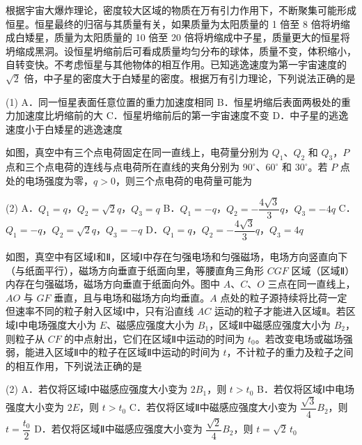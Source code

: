 \begin{question}
根据宇宙大爆炸理论，密度较大区域的物质在万有引力作用下，不断聚集可能形成恒星。恒星最终的归宿与其质量有关，如果质量为太阳质量的 1 倍至 8 倍将坍缩成白矮星，质量为太阳质量的 10 倍至 20 倍将坍缩成中子星，质量更大的恒星将坍缩成黑洞。设恒星坍缩前后可看成质量均匀分布的球体，质量不变，体积缩小，自转变快。不考虑恒星与其他物体的相互作用。已知逃逸速度为第一宇宙速度的 $\sqrt{2}$ 倍，中子星的密度大于白矮星的密度。根据万有引力理论，下列说法正确的是\gkblank

\begin{gkopts}(1)
  \task A．同一恒星表面任意位置的重力加速度相同
  \task B．恒星坍缩后表面两极处的重力加速度比坍缩前的大
  \task C．恒星坍缩前后的第一宇宙速度不变
  \task D．中子星的逃逸速度小于白矮星的逃逸速度
\end{gkopts}
\end{question}

\begin{question}
如图，真空中有三个点电荷固定在同一直线上，电荷量分别为 $Q_{1}$、$Q_{2}$ 和 $Q_{3}$，$P$ 点和三个点电荷的连线与点电荷所在直线的夹角分别为 $90^{\circ}$、$60^{\circ}$ 和 $30^{\circ}$。若 $P$ 点处的电场强度为零，$q>0$，则三个点电荷的电荷量可能为\gkblank


\begin{gkopts}(2)
  \task A．$Q_{1}=q$，$Q_{2}=\sqrt{2}q$，$Q_{3}=q$
  \task B．$Q_{1}=-q$，$Q_{2}=-\dfrac{4\sqrt{3}}{3}q$，$Q_{3}=-4q$
  \task C．$Q_{1}=-q$，$Q_{2}=\sqrt{2}q$，$Q_{3}=-q$
  \task D．$Q_{1}=q$，$Q_{2}=-\dfrac{4\sqrt{3}}{3}q$，$Q_{3}=4q$
\end{gkopts}
\end{question}

\begin{question}
如图，真空中有区域Ⅰ和Ⅱ，区域Ⅰ中存在匀强电场和匀强磁场，电场方向竖直向下（与纸面平行），磁场方向垂直于纸面向里，等腰直角三角形 $CGF$ 区域（区域Ⅱ）内存在匀强磁场，磁场方向垂直于纸面向外。图中 $A$、$C$、$O$ 三点在同一直线上，$AO$ 与 $GF$ 垂直，且与电场和磁场方向均垂直。$A$ 点处的粒子源持续将比荷一定但速率不同的粒子射入区域Ⅰ中，只有沿直线 $AC$ 运动的粒子才能进入区域Ⅱ。若区域Ⅰ中电场强度大小为 $E$、磁感应强度大小为 $B_{1}$，区域Ⅱ中磁感应强度大小为 $B_{2}$，则粒子从 $CF$ 的中点射出，它们在区域Ⅱ中运动的时间为 $t_{0}$。若改变电场或磁场强弱，能进入区域Ⅱ中的粒子在区域Ⅱ中运动的时间为 $t$，不计粒子的重力及粒子之间的相互作用，下列说法正确的是\gkblank


\begin{gkopts}(2)
  \task A．若仅将区域Ⅰ中磁感应强度大小变为 $2B_{1}$，则 $t>t_{0}$
  \task B．若仅将区域Ⅰ中电场强度大小变为 $2E$，则 $t>t_{0}$
  \task C．若仅将区域Ⅱ中磁感应强度大小变为 $\dfrac{\sqrt{3}}{4}B_{2}$，则 $t=\dfrac{t_{0}}{2}$
  \task D．若仅将区域Ⅱ中磁感应强度大小变为 $\dfrac{\sqrt{2}}{4}B_{2}$，则 $t=\sqrt{2}\,t_{0}$
\end{gkopts}
\end{question}

